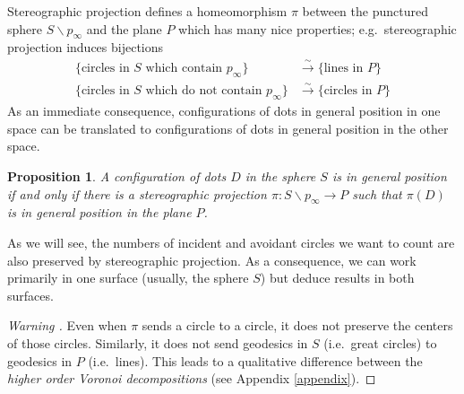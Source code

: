 \documentclass[11pt,oneside]{amsart}
\newtheorem{prop}[thm]{Proposition}
\theoremstyle{definition}
\theoremstyle{remark}
\newenvironment{warn}{\refstepcounter{thm}\begin{proof}[Warning \emph{\thethm}]\renewcommand*{\qedsymbol}{\(\blacksquare\)}}{\end{proof}}
\numberwithin{equation}{section}
\begin{document}
Stereographic projection defines a homeomorphism $\pi$ between the punctured sphere $S\smallsetminus p_\infty$ and the plane $P$ which has many nice properties; e.g.~stereographic projection induces bijections
\[
\begin{aligned}
\{\text{circles in $S$ which contain $p_\infty$}\} &\xrightarrow{\sim} \{\text{lines in $P$}\}
\\
\{\text{circles in $S$ which do not contain $p_\infty$}\} &\xrightarrow{\sim} \{\text{circles in $P$}\}
\end{aligned}
\]
As an immediate consequence, configurations of dots in general position in one space can be translated to configurations of dots in general position in the other space.
\begin{prop}
A configuration of dots $D$ in the sphere $S$ is in general position if and only if there is a stereographic projection $\pi:S\smallsetminus p_\infty\rightarrow P$ such that $\pi(D)$ is in general position in the plane $P$.
\end{prop}

As we will see, the numbers of incident and avoidant circles we want to count are also preserved by stereographic projection.
As a consequence, we can work primarily in one surface (usually, the sphere $S$) but deduce results in both surfaces.


\begin{warn}
Even when $\pi$ sends a circle to a circle, it does not preserve the centers of those circles.
Similarly, it does not send geodesics in $S$ (i.e.~great circles) to geodesics in $P$ (i.e.~lines). This leads to a qualitative difference between the \emph{higher order Voronoi decompositions} (see Appendix \ref{appendix}).
\end{warn}


\end{document}
